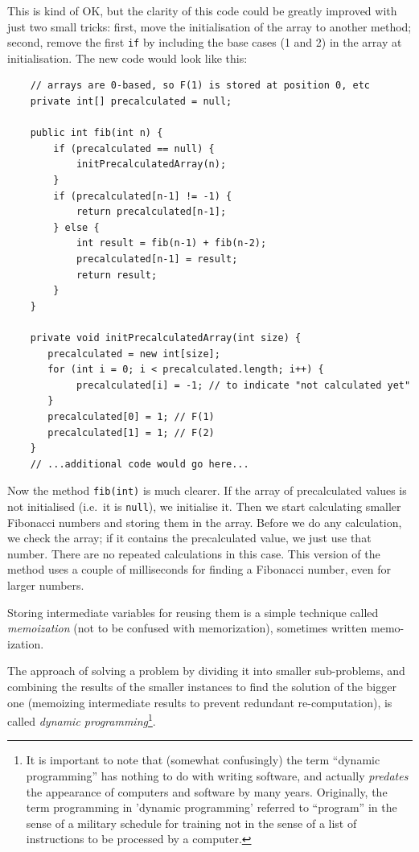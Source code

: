 This is kind of OK, but the clarity of this code could be greatly
improved with just two small tricks: first, move the initialisation
of the array to another method; second, remove the first \verb+if+ by
including the base cases (1 and 2) in the array at initialisation. The
new code would look like this: 

\begin{verbatim}
    // arrays are 0-based, so F(1) is stored at position 0, etc
    private int[] precalculated = null;

    public int fib(int n) {
        if (precalculated == null) {
            initPrecalculatedArray(n);
        }
        if (precalculated[n-1] != -1) {
            return precalculated[n-1];
        } else {
            int result = fib(n-1) + fib(n-2);
            precalculated[n-1] = result;
            return result;
        }
    }

    private void initPrecalculatedArray(int size) {
       precalculated = new int[size];
       for (int i = 0; i < precalculated.length; i++) {
            precalculated[i] = -1; // to indicate "not calculated yet"
       }
       precalculated[0] = 1; // F(1)
       precalculated[1] = 1; // F(2)
    }
    // ...additional code would go here...
\end{verbatim}

Now the method \verb+fib(int)+ is much clearer. If the array of
precalculated values is not initialised (i.e.~it is \verb+null+), we
initialise it. Then we start calculating smaller Fibonacci numbers and
storing them in the array. Before we do any calculation, we check the
array; if it contains the precalculated value, we just use that
number. There are no repeated calculations in this case. This version of the
method uses a couple of milliseconds for finding a Fibonacci number,
even for larger numbers. 

Storing intermediate variables for reusing them is a simple technique
called \emph{memoization} (not to be confused with memorization),
sometimes written memo-ization. 

The approach of solving a problem by dividing it into smaller
sub-problems, and combining the results of the smaller instances to
find the solution of the bigger one (memoizing intermediate results to
prevent redundant re-computation), is called \emph{dynamic
  programming}\footnote{It is important to note that (somewhat
  confusingly) the term ``dynamic programming'' has nothing to do with
  writing software, and actually \emph{predates} the appearance of
  computers and software by many years. 
  Originally, the term programming in 'dynamic programming'
  referred to ``program'' in the sense of a military schedule for
  training not in the sense of a list of instructions to be processed
  by a computer.}.





